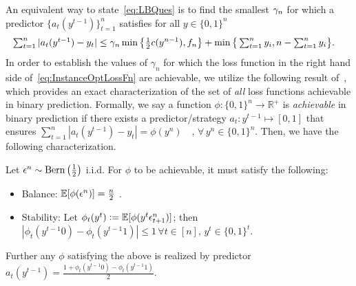 An equivalent way to state~\cref{eq:LBQues} is to find the smallest $\gamma_n$ for which a predictor $\{a_t(y^{t-1})\}_{t=1}^n$ satisfies for all $y\in\{0,1\}^n$
\begin{align}\label{eq:InstanceOptLossFn}
   \textstyle\sum_{t=1}^n |a_t(y^{t-1})-y_t| 
   &\le \gamma_n \min\big\{\tfrac12 c(y^{n-1}), f_n\big\} + \min\big\{\textstyle\sum_{t=1}^n y_i, n-\textstyle\sum_{t=1}^n y_i\big\}. 
\end{align}
In order to establish the values of $\gamma_n$ for which the loss function in the right hand side of~\cref{eq:InstanceOptLossFn} are achievable, we utilize the following result of~\cite{Cover1966}, which provides an exact characterization of the set of \emph{all} loss functions achievable in binary prediction. Formally, we say a function $\phi : \{0,1\}^n \to \mathbb{R}^+$ is \emph{achievable} in binary prediction if there exists a predictor/strategy $a_t: y^{t-1} \mapsto [0,1]$ that ensures $\sum_{t=1}^n |a_t(y^{t-1})-y_t| = \phi(y^n)\quad,\,\forall\,y^n\in\{0,1\}^n$. 
Then, we have the following characterization.
\begin{theorem}  
\label{thm:CoverAchievableFn}
Let $\epsilon^n \sim \mathrm{Bern}\left(\frac{1}{2}\right)$ i.i.d. For $\phi$ to be achievable, it must satisfy the following:
\begin{itemize}
    \item Balance:  $\operatorname{\mathbb{E}}[\phi(\epsilon^n)] = \frac{n}{2}$ . 
    \item Stability: Let $\phi_t(y^t) \mathrel{\mathop{:}}= \operatorname{\mathbb{E}}[\phi(y^{t}\epsilon_{t+1}^n)]$; then $|\phi_t(y^{t-1}0)-\phi_t(y^{t-1}1)| \le 1\,\forall t\in [n], \,y^t\in\{0,1\}^t$. 
    \end{itemize}
    Further any $\phi$ satisfying the above is realized by predictor  $a_t(y^{t-1}) = \frac{1+\phi_t(y^{t-1}0)-\phi_t(y^{t-1}1)}{2}
    $.
\end{theorem}
